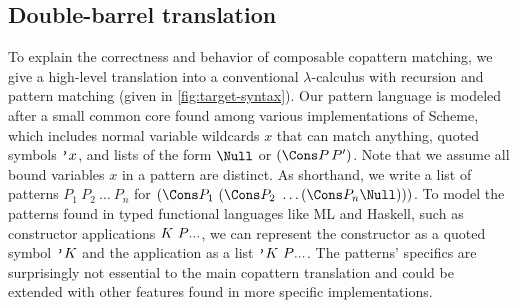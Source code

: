
\subsection{Double-barrel translation}

To explain the correctness and behavior of composable copattern matching, we give a high-level translation into a conventional $\lambda$-calculus with recursion and pattern matching (given in \cref{fig:target-syntax}).
Our pattern language is modeled after a small common core found among various implementations of Scheme, which includes normal variable wildcards $x$ that can match anything, quoted symbols $\text{\tt'}{x}$, and lists of the form $\Null$ or $(\Cons P \, P')$.
Note that we assume all bound variables $x$ in a pattern are distinct.
As shorthand, we write a list of patterns $P_1 ~ P_2 ~ \dots ~ P_n$ for $(\Cons P_1 ~ (\Cons P_2 ~ \dots (\Cons P_n \Null)))$.
To model the patterns found in typed functional languages like ML and Haskell, such as constructor applications $K ~ P\overset{{}_{}}{...}$, we can represent the constructor  as a quoted symbol $\text{\tt'}{K}$ and the application as a list $\text{\tt'}{K} ~ P\overset{{}_{}}{...}$.
The patterns' specifics are surprisingly not essential to the main copattern translation and could be extended with other features found in more specific implementations.  

